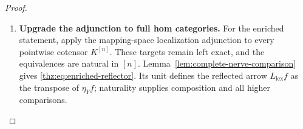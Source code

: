 \documentclass[oneside]{article}
\theoremstyle{plain}
\theoremstyle{definition}
\theoremstyle{remark}
\newcommand{\Cat}{\mathbf{Cat}_{\infty}}
\newcommand{\Fun}{\operatorname{Fun}}
\newcommand{\Map}{\operatorname{Map}}
\begin{document}
\begin{proof}
\begin{enumerate}
\begin{samepage}
Copowered Yoneda identifies the localization test with the nerve-level
limit comparison in the square
\[
\begin{tikzcd}[column sep=2em,row sep=large]
 \Map(h_\ell\times[n],K)\ar[r]\ar[d,"\simeq"']&
 \displaystyle\lim_j\Map(h_{Dj}\times[n],K)\ar[d,"\simeq"]\\
 \Map_{\Cat}([n],K(\ell))\ar[r]&
 \displaystyle\lim_j\Map_{\Cat}([n],K(Dj)).
\end{tikzcd}
\]
The upper mapping spaces are taken in $\Fun(T,\Cat)$.
\end{samepage}
\item \textbf{Upgrade the adjunction to full hom categories.} For the enriched statement, apply the mapping-space localization
adjunction to every pointwise cotensor $K^{[n]}$. These targets remain
left exact, and the equivalences are natural in $[n]$.
Lemma~\ref{lem:complete-nerve-comparison} gives
\eqref{thz:eq:enriched-reflector}. Its unit defines the reflected arrow
$L_{\mathrm{lex}}f$ as the transpose of $\eta_Yf$; naturality supplies
composition and all higher comparisons.\qedhere
\end{enumerate}
\end{proof}
\end{document}
